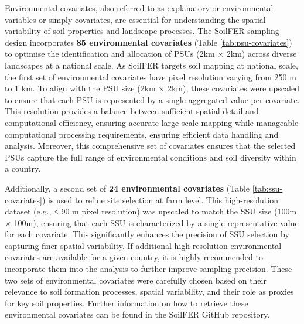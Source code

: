 \documentclass[
  10pt,
  b5paper,
  oneside]{book}
\begin{document}
Environmental covariates, also referred to as explanatory or environmental variables or simply covariates, are essential for understanding the spatial variability of soil properties and landscape processes. The SoilFER sampling design incorporates \textbf{85 environmental covariates} (Table \ref{tab:psu-covariates}) to optimise the identification and allocation of PSUs (2km × 2km) across diverse landscapes at a national scale. As SoilFER targets soil mapping at national scale, the first set of environmental covariates have pixel resolution varying from 250 m to 1 km. To align with the PSU size (2km × 2km), these covariates were upscaled to ensure that each PSU is represented by a single aggregated value per covariate. This resolution provides a balance between sufficient spatial detail and computational efficiency, ensuring accurate large-scale mapping while manageable computational processing requirements, ensuring efficient data handling and analysis. Moreover, this comprehensive set of covariates ensures that the selected PSUs capture the full range of environmental conditions and soil diversity within a country.

Additionally, a second set of \textbf{24 environmental covariates} (Table \ref{tab:ssu-covariates}) is used to refine site selection at farm level. This high-resolution dataset (e.g., ≤ 90 m pixel resolution) was upscaled to match the SSU size (100m × 100m), ensuring that each SSU is characterized by a single representative value for each covariate. This significantly enhances the precision of SSU selection by capturing finer spatial variability. If additional high-resolution environmental covariates are available for a given country, it is highly recommended to incorporate them into the analysis to further improve sampling precision. These two sets of environmental covariates were carefully chosen based on their relevance to soil formation processes, spatial variability, and their role as proxies for key soil properties. Further information on how to retrieve these environmental covariates can be found in the SoilFER GitHub repository.
\end{document}
